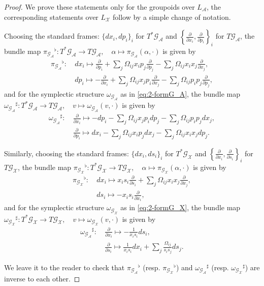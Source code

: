 \documentclass{amsart}
\numberwithin{equation}{section}
\newcommand{\cA}{\mathcal{A}}
\newcommand{\cG}{\mathcal{G}}
\newcommand{\cX}{\mathcal{X}}
\begin{document}
\begin{proof}
  We prove these statements only for the groupoids over $L_\cA$, the corresponding statements over $L_\cX$ follow by a simple change of notation.

Choosing the standard frames: $\{dx_i, dp_i\}_i$ for $T^*\cG_\cA$ and $\left\{\frac{\partial}{\partial x_i}, \frac{\partial}{\partial p_i}\right\}_i$ for $T\cG_\cA$, the bundle map ${\pi_{\cG_\cA}}^\flat: T^*\cG_\cA \to T\cG_\cA, \quad \alpha \mapsto \pi_{\cG_\cA}(\alpha, \cdot)$ is given by
\begin{align*}
	{\pi_{\cG_\cA}}^\flat: &~ dx_i \mapsto \frac{\partial}{\partial p_i} + \sum_{j} \Omega_{ij}x_i p_j \frac{\partial}{\partial p_j}- \sum_{j} \Omega_{ij}x_ix_j \frac{\partial}{\partial x_j}, \\
	&~ dp_i \mapsto - \frac{\partial}{\partial x_i} + \sum_{j} \Omega_{ij}x_j p_i \frac{\partial}{\partial x_j}- \sum_{j} \Omega_{ij}p_ip_j \frac{\partial}{\partial p_j},
\end{align*}
and for the symplectic structure $\omega_{\cG_\cA}$ as in \eqref{eq:2-formG_A}, the bundle map ${\omega_{\cG_\cA}}^\sharp: T^*\cG_\cA \to T\cG_\cA, \quad v \mapsto \omega_{\cG_\cA}(v, \cdot)$ is given by
\begin{align*}
	{\omega_{\cG_\cA}}^\sharp: &~ \frac{\partial}{\partial x_i} \mapsto - dp_i
			- \sum_{j} \Omega_{ij}x_j p_i d p_j 	- \sum_{j} \Omega_{ij}p_ip_j d x_j, \\
	&~ \frac{\partial}{\partial p_i} \mapsto dx_i - \sum_{j} \Omega_{ij}x_i p_j d x_j 
			- \sum_{j} \Omega_{ij}x_ix_j d p_j.
\end{align*}

Similarly, choosing the standard frames: $\{dx_i, ds_i\}_i$ for $T^*\cG_\cX$ and $\left\{\frac{\partial}{\partial x_i}, \frac{\partial}{\partial s_i}\right\}_i$ for $T\cG_\cX$, the bundle map ${\pi_{\cG_\cX}}^\flat: T^*\cG_\cX \to T\cG_\cX, \quad \alpha \mapsto \pi_{\cG_\cX}(\alpha, \cdot)$ is given by
\begin{align*}
	{\pi_{\cG_\cX}}^\flat: &~ dx_i \mapsto x_i s_i\frac{\partial}{\partial s_i} + \sum_{j} \Omega_{ij}x_i x_j \frac{\partial}{\partial x_j}, \\
	&~ ds_i \mapsto - x_i s_i \frac{\partial}{\partial x_i},
\end{align*}
and for the symplectic structure $\omega_{\cG_\cX}$ as in \eqref{eq:2-formG_X}, the bundle map ${\omega_{\cG_\cX}}^\sharp: T^*\cG_\cX \to T\cG_\cX, \quad v \mapsto \omega_{\cG_\cX}(v, \cdot)$ is given by
\begin{align*}
	{\omega_{\cG_\cA}}^\sharp: &~ \frac{\partial}{\partial x_i} \mapsto - \frac{1}{x_i s_i} ds_i, \\
	&~ \frac{\partial}{\partial s_i} \mapsto \frac{1}{x_i s_i} dx_i + \sum_{j} \frac{\Omega_{ij}}{s_i s_j} d s_j.
\end{align*}

We leave it to the reader to check that ${\pi_{\cG_\cA}}^\flat$ (resp. ${\pi_{\cG_\cX}}^\flat$) and ${\omega_{\cG_\cA}}^\sharp$ (resp. ${\omega_{\cG_\cX}}^\sharp$) are inverse to each other.
\end{proof}
\end{document}
